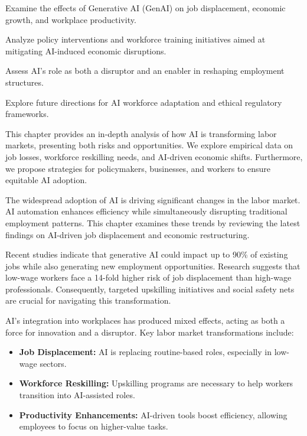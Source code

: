 \documentclass[a4paper,headinclude=on,footinclude=on,12pt,oneside]{scrbook}
\begin{document}
\begin{arrows}
	\item Examine the effects of Generative AI (GenAI) on job displacement, economic growth, and workplace productivity.
	\item Analyze policy interventions and workforce training initiatives aimed at mitigating AI-induced economic disruptions.
	\item Assess AI’s role as both a disruptor and an enabler in reshaping employment structures.
	\item Explore future directions for AI workforce adaptation and ethical regulatory frameworks.
\end{arrows}

This chapter provides an in-depth analysis of how AI is transforming labor markets, presenting both risks and opportunities. We explore empirical data on job losses, workforce reskilling needs, and AI-driven economic shifts. Furthermore, we propose strategies for policymakers, businesses, and workers to ensure equitable AI adoption.


The widespread adoption of AI is driving significant changes in the labor market. AI automation enhances efficiency while simultaneously disrupting traditional employment patterns. This chapter examines these trends by reviewing the latest findings on AI-driven job displacement and economic restructuring.

Recent studies indicate that generative AI could impact up to 90\% of existing jobs while also generating new employment opportunities. Research suggests that low-wage workers face a 14-fold higher risk of job displacement than high-wage professionals. Consequently, targeted upskilling initiatives and social safety nets are crucial for navigating this transformation.


AI’s integration into workplaces has produced mixed effects, acting as both a force for innovation and a disruptor. Key labor market transformations include:
\begin{itemize}
	\item \textbf{Job Displacement:} AI is replacing routine-based roles, especially in low-wage sectors.
	\item \textbf{Workforce Reskilling:} Upskilling programs are necessary to help workers transition into AI-assisted roles.
	\item \textbf{Productivity Enhancements:} AI-driven tools boost efficiency, allowing employees to focus on higher-value tasks.
\end{itemize}
\end{document}
